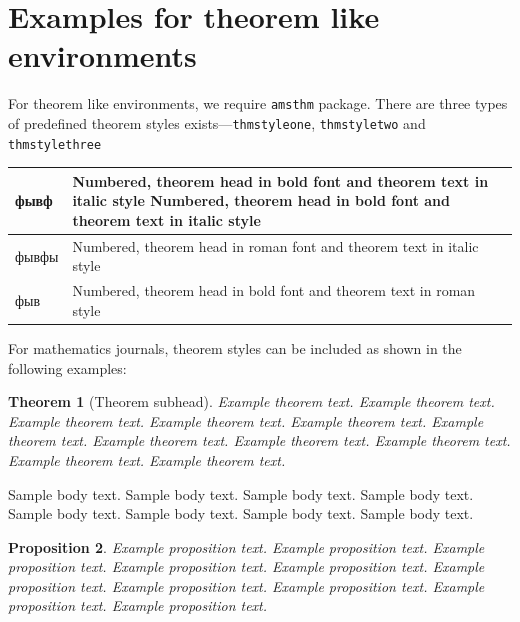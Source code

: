 \documentclass[pdflatex,sn-mathphys-num]{sn-jnl}%
\theoremstyle{thmstyleone}%
\newtheorem{theorem}{Theorem}%
\newtheorem{proposition}[theorem]{Proposition}%
\theoremstyle{thmstyletwo}%
\theoremstyle{thmstylethree}%
\begin{document}
\section{Examples for theorem like environments}\label{sec10}

For theorem like environments, we require \verb+amsthm+ package. There are three types of predefined theorem styles exists---\verb+thmstyleone+, \verb+thmstyletwo+ and \verb+thmstylethree+ 

\bigskip
\begin{tabular}{|l|p{19pc}|}
\hline
фывф & Numbered, theorem head in bold font and theorem text in italic style Numbered, theorem head in bold font and theorem text in italic style  \\\hline
фывфы & Numbered, theorem head in roman font and theorem text in italic style \\\hline
фыв& Numbered, theorem head in bold font and theorem text in roman style \\\hline
\end{tabular}
\bigskip

For mathematics journals, theorem styles can be included as shown in the following examples:

\begin{theorem}[Theorem subhead]\label{thm1}
Example theorem text. Example theorem text. Example theorem text. Example theorem text. Example theorem text. 
Example theorem text. Example theorem text. Example theorem text. Example theorem text. Example theorem text. 
Example theorem text. 
\end{theorem}

Sample body text. Sample body text. Sample body text. Sample body text. Sample body text. Sample body text. Sample body text. Sample body text.

\begin{proposition}
Example proposition text. Example proposition text. Example proposition text. Example proposition text. Example proposition text. 
Example proposition text. Example proposition text. Example proposition text. Example proposition text. Example proposition text. 
\end{proposition}
\end{document}
